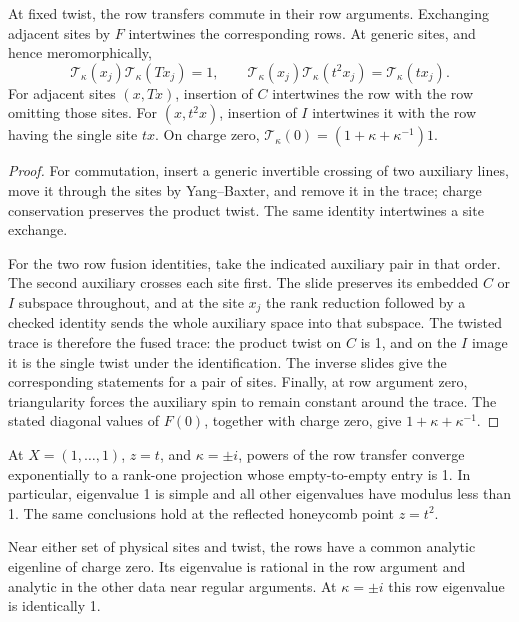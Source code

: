 \begin{lemma}\label{lem:pv:row-relations}
At fixed twist, the row transfers commute in their row arguments.
Exchanging adjacent sites by \(F\) intertwines the corresponding rows.
At generic sites, and hence meromorphically,
\[
 \mathcal T_{\kappa}(x_j)\mathcal T_{\kappa}(Tx_j)=1,\qquad
 \mathcal T_{\kappa}(x_j)\mathcal T_{\kappa}(t^2x_j)=\mathcal T_{\kappa}(tx_j).
\]
For adjacent sites \((x,Tx)\), insertion of \(C\) intertwines the row
with the row omitting those sites. For \((x,t^2x)\), insertion of \(I\)
intertwines it with the row having the single site \(tx\). On charge zero,
\(\mathcal T_\kappa(0)=(1+\kappa+\kappa^{-1})1\).
\end{lemma}

\begin{proof}
For commutation, insert a generic invertible crossing of two auxiliary
lines, move it through the sites by Yang--Baxter, and remove it in the
trace; charge conservation preserves the product twist. The same
identity intertwines a site exchange.

For the two row fusion identities, take the indicated auxiliary pair
in that order. The second auxiliary crosses each site first. The slide
preserves its embedded \(C\) or \(I\) subspace throughout, and at the
site \(x_j\) the rank reduction followed by a checked identity sends
the whole auxiliary space into that subspace. The twisted trace is
therefore the fused trace: the product twist on \(C\) is 1, and on
the \(I\) image it is the single twist under the identification.
The inverse slides give the corresponding statements for a pair of
sites. Finally, at row argument zero, triangularity forces the auxiliary
spin to remain constant around the trace. The stated diagonal values
of \(F(0)\), together with charge zero, give
\(1+\kappa+\kappa^{-1}\).
\end{proof}

\begin{lemma}\label{lem:pv:physical-eigenline}
At \(X=(1,\ldots,1)\), \(z=t\), and \(\kappa=\pm i\), powers of
the row transfer converge exponentially to a rank-one projection whose
empty-to-empty entry is 1. In particular, eigenvalue 1 is simple and
all other eigenvalues have modulus less than 1. The same conclusions
hold at the reflected honeycomb point \(z=t^2\).

Near either set of physical sites and twist, the rows have a common
analytic eigenline of charge zero. Its eigenvalue is rational in the
row argument and analytic in the other data near regular arguments.
At \(\kappa=\pm i\) this row eigenvalue is identically 1.
\end{lemma}

